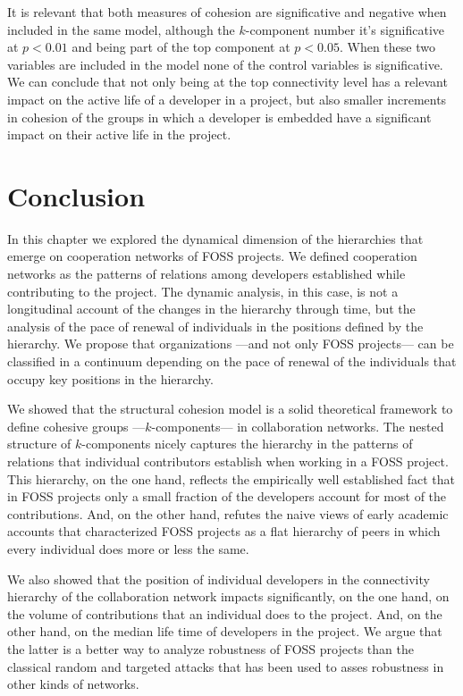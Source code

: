 It is relevant that both measures of cohesion are significative and negative when included in the same model, although the $k$-component number it's significative at $p < 0.01$ and being part of the top component at $p < 0.05$. When these two variables are included in the model none of the control variables is significative. We can conclude that not only being at the top connectivity level has a relevant impact on the active life of a developer in a project, but also smaller increments in cohesion of the groups in which a developer is embedded have a significant impact on their active life in the project.

\section{Conclusion}

In this chapter we explored the dynamical dimension of the hierarchies that emerge on cooperation networks of FOSS projects. We defined cooperation networks as the patterns of relations among developers established while contributing to the project. The dynamic analysis, in this case, is not a longitudinal account of the changes in the hierarchy through time, but the analysis of the pace of renewal of individuals in the positions defined by the hierarchy. We propose that organizations ---and not only FOSS projects--- can be classified in a continuum depending on the pace of renewal of the individuals that occupy key positions in the hierarchy.

We showed that the structural cohesion model \citep{white:2001, moody:2003} is a solid theoretical framework to define cohesive groups ---$k$-components--- in collaboration networks. The nested structure of $k$-components nicely captures the hierarchy in the patterns of relations that individual contributors establish when working in a FOSS project. This hierarchy, on the one hand, reflects the empirically well established fact that in FOSS projects only a small fraction of the developers account for most of the contributions. And, on the other hand, refutes the naive views of early academic accounts that characterized FOSS projects as a flat hierarchy of peers in which every individual does more or less the same.

We also showed that the position of individual developers in the connectivity hierarchy of the collaboration network impacts significantly, on the one hand, on the volume of contributions that an individual does to the project. And, on the other hand, on the median life time of developers in the project. We argue that the latter is a better way to analyze robustness of FOSS projects than the classical random and targeted attacks that has been used to asses robustness in other kinds of networks.

